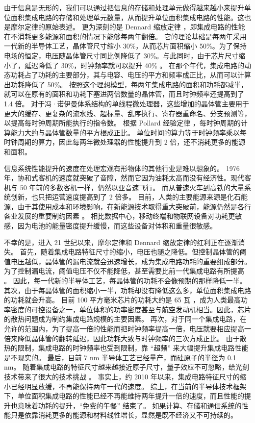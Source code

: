 由于信息是无形的，我们可以通过把信息的存储和处理单元做得越来越小来提升单位面积集成电路的存储和处理单元数量，从而提升单位面积集成电路的性能。这也是摩尔定律的原始表述。
更为深刻的是 Dennard 缩放定律 \cite{dennard1974design}，即集成电路的性能在不消耗更多能源和面积的情况下能够每两年翻倍。
它的理论基础是每两年采用一代新的半导体工艺，晶体管尺寸缩小 30\%，从而芯片面积缩小 50\%。为了保持电场的恒定，电压随晶体管尺寸同比例降低了 30\%。与此同时，由于芯片尺寸缩小了，延迟降低了 30\%，时钟频率就可以提升 40\% \cite{borkar1999design,borkar2011future}。
在那个年代，集成电路的动态功耗占了功耗的主要部分，其与电容、电压的平方和频率成正比，从而可以计算出功耗降低了 50\%。
按照这个理想模型，每两年集成电路的面积和功耗都减半，就可以在原有的面积和功耗下塞进两倍数量的晶体管，而且时钟频率还提高到了 1.4 倍。
对于冯·诺伊曼体系结构的单线程微处理器，这些增加的晶体管主要用于更大的缓存、更复杂的流水线、超标量、乱序执行、寄存器重命名、分支预测等，以提高每时钟周期所能执行的指令数。
根据 Pollard 经验定律 \cite{pollackpollack}，每时钟周期的计算能力大约与晶体管数量的平方根成正比。
单位时间的算力等于时钟频率乘以每时钟周期的算力，因此每两年微处理器的性能提升到 2 倍，还不消耗更多的能源和面积。

信息系统性能提升的速度在处理宏观有形物体的其他行业是难以想象的。
1976 年，协和式客机的速度就突破了音障，然而它因为油耗太高而没有经济性。现代客机与 50 年前的多数客机一样，仍然以亚音速飞行。
而从普速火车到高铁的大量系统创新，也只把运营速度提高到了 2 倍多。
目前，人类的主要能源来源是化石能源，由于其使用成本和环境影响，在新能源技术取得重大突破前，能源仍然是各行各业发展的重要制约因素 \cite{energy}。
相比数据中心，移动终端和物联网设备对功耗更敏感，因为电池的能量密度提升缓慢，而这些设备对体积和重量很敏感。

不幸的是，进入 21 世纪以来，摩尔定律和 Dennard 缩放定律的红利正在逐渐消失。
首先，随着集成电路特征尺寸的缩小，电压也随之降低。但控制晶体管的阈值电压越低，晶体管的漏电流就会迅速增长，成为集成电路功耗的重要组成部分。
为了控制漏电流，阈值电压不仅不能降低，甚至需要比前一代集成电路有所提高 \cite{borkar1999design}。
因此，每一代新的半导体工艺，每晶体管的功耗不会像预期的那样降低一半。
其次，由于每晶体管的面积缩小一半，功耗却没有降低这么多，单位面积集成电路的功耗就会升高。
目前 100 平方毫米芯片的功耗大约是 65 瓦 \cite{borkar2011future}，成为人类最高功率密度的可控设备之一，单位体积的功率密度甚至与航空发动机相当。因此，芯片的散热问题成为制约集成电路规模的主要因素。
再次，对于同一个集成电路，在允许的范围内，为了提高一倍的性能而把时钟频率提高一倍，电压就要相应提高一倍来降低晶体管的翻转延迟，因此功耗大致与时钟频率的三次方成正比。
由于散热的限制，集成电路的时钟频率也受到限制，靠 ``超频'' 来大幅提升集成电路性能是不现实的。
最后，目前 7 nm 半导体工艺已经量产，而硅原子的半径为 0.1 nm。
随着集成电路的特征尺寸越来越接近原子尺寸，量子效应不可忽略，给光刻技术带来了很大的技术挑战 \cite{borkar2011future}。
事实上，约 2010 年以来，集成电路特征尺寸的缩小已经明显放缓，不再能保持两年一代的速度。
综上，在当前的半导体技术框架下，单位面积集成电路的性能已经不再能维持两年提升一倍的速度，而且性能的提升也意味着功耗的提升，``免费的午餐'' 结束了。
如果计算、存储和通信系统的性能只是依靠消耗更多的能源和材料线性增长，显然是既不经济又不可持续的。

